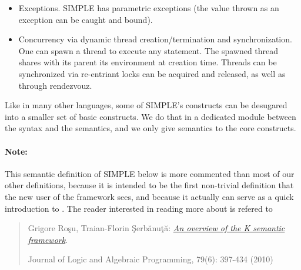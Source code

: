 {\begin{itemize}
next value in the input buffer, and the statement \texttt{write(e)}
evaluates \texttt{e} and outputs its value to the output buffer.  The
input and output buffers are lists of values.
\item Exceptions.  SIMPLE has parametric exceptions (the value thrown as
an exception can be caught and bound).
\item Concurrency via dynamic thread creation/termination and
synchronization.  One can spawn a thread to execute any statement.
The spawned thread shares with its parent its environment at creation time.
Threads can be synchronized via re-entriant locks can be acquired and released,
as well as through rendezvouz.
\end{itemize}
Like in many other languages, some of SIMPLE's constructs can be
desugared into a smaller set of basic constructs.  We do that in a 
dedicated module between the syntax and the semantics, and we only
give semantics to the core constructs.

\paragraph{Note:}{
This \K semantic definition of SIMPLE below is more commented than most
of our other \K definitions, because it is intended to be the first
non-trivial \K definition that the new user of the \K framework sees, and
because it actually can serve as a quick introduction to \K.  The reader
interested in reading more about \K is refered to
\begin{quote}
Grigore Ro\c su, Traian-Florin \c Serb\u anu\c t\u a: \href{http://dx.doi.org/10.1016/j.jlap.2010.03.012}{\em An overview of the K semantic framework}.

Journal of Logic and Algebraic Programming, 79(6): 397-434 (2010)
\end{quote}
}
}

\vspace*{3ex}
